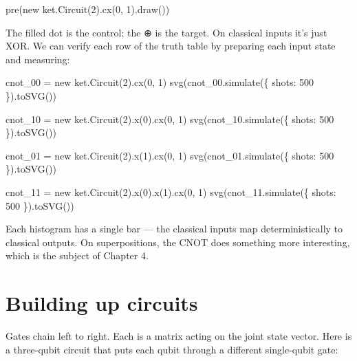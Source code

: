 \documentclass[
  11pt,
  letterpaper,
  oneside]{scrbook}
\newenvironment{Shaded}{\begin{snugshade}}{\end{snugshade}}
\newcommand{\NormalTok}[1]{\textcolor[rgb]{0.00,0.23,0.31}{#1}}
\begin{document}
\begin{Shaded}
\begin{Highlighting}[]
\NormalTok{pre(new ket.Circuit(2).cx(0, 1).draw())}
\end{Highlighting}
\end{Shaded}

The filled dot is the control; the ⊕ is the target. On classical inputs
it's just XOR. We can verify each row of the truth table by preparing
each input state and measuring:

\begin{Shaded}
\begin{Highlighting}[]
\NormalTok{cnot\_00 = new ket.Circuit(2).cx(0, 1)}
\NormalTok{svg(cnot\_00.simulate(\{ shots: 500 \}).toSVG())}
\end{Highlighting}
\end{Shaded}

\begin{Shaded}
\begin{Highlighting}[]
\NormalTok{cnot\_10 = new ket.Circuit(2).x(0).cx(0, 1)}
\NormalTok{svg(cnot\_10.simulate(\{ shots: 500 \}).toSVG())}
\end{Highlighting}
\end{Shaded}

\begin{Shaded}
\begin{Highlighting}[]
\NormalTok{cnot\_01 = new ket.Circuit(2).x(1).cx(0, 1)}
\NormalTok{svg(cnot\_01.simulate(\{ shots: 500 \}).toSVG())}
\end{Highlighting}
\end{Shaded}

\begin{Shaded}
\begin{Highlighting}[]
\NormalTok{cnot\_11 = new ket.Circuit(2).x(0).x(1).cx(0, 1)}
\NormalTok{svg(cnot\_11.simulate(\{ shots: 500 \}).toSVG())}
\end{Highlighting}
\end{Shaded}

Each histogram has a single bar --- the classical inputs map
deterministically to classical outputs. On superpositions, the CNOT does
something more interesting, which is the subject of Chapter 4.

\section{Building up circuits}\label{building-up-circuits}

Gates chain left to right. Each is a matrix acting on the joint state
vector. Here is a three-qubit circuit that puts each qubit through a
different single-qubit gate:
\end{document}
